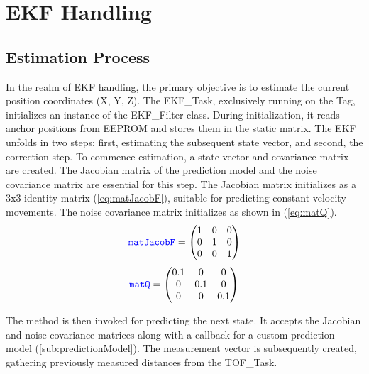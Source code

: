 \chapter{EKF Handling}
\label{chap:EKF_Handling}
\section{Estimation Process}
\label{sec:Estimation_Process}
In the realm of EKF handling, the primary objective is to estimate the current position coordinates (X, Y, Z). The EKF\_Task, exclusively running on the Tag, initializes an instance of the EKF\_Filter class. During initialization, it reads anchor positions from EEPROM and stores them in the static  matrix.
\vspace{4pt}
\newline
The EKF unfolds in two steps: first, estimating the subsequent state vector, and second, the correction step. To commence estimation, a state vector and covariance matrix are created. The Jacobian matrix of the prediction model and the noise covariance matrix are essential for this step. The Jacobian matrix  initializes as a 3x3 identity matrix (\ref{eq:matJacobF}), suitable for predicting constant velocity movements. The noise covariance matrix  initializes as shown in (\ref{eq:matQ}).
\begin{equation}
	\begin{centering}
		\blueconsolas{matJacobF} =
		\begin{pmatrix}
			1 & 0 & 0 \\
			0 & 1 & 0 \\
			0 & 0 & 1
		\end{pmatrix}
	\end{centering}
	\label{eq:matJacobF}
\end{equation}
\begin{equation}
	\begin{centering}
		\blueconsolas{matQ} =
		\begin{pmatrix}
			0.1 & 0 & 0 \\
			0 & 0.1 & 0 \\
			0 & 0 & 0.1
		\end{pmatrix}
	\end{centering}
	\label{eq:matQ}
\end{equation}

The  method is then invoked for predicting the next state. It accepts the Jacobian and noise covariance matrices along with a callback for a custom prediction model (\ref{sub:predictionModel}). The measurement vector  is subsequently created, gathering previously measured distances from the TOF\_Task.

